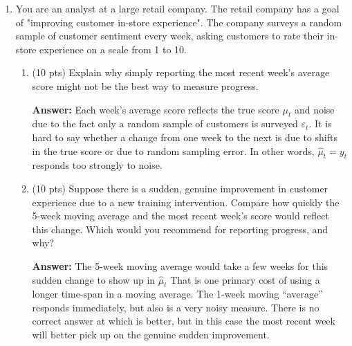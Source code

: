 \documentclass[12pt]{article}
\newcommand{\answer}[1]{{\color{blue_winged_teal}\textbf{Answer:} #1}}
\newcommand{\pts}[1]{{\color{zinc500}(#1 pts)}}
\begin{document}
\begin{enumerate}
\begin{enumerate}
    \answer{For every one additional worker a store has, the average daily revenue is expected to be \$2247 higher on average.}

    \item \pts{10} The company does not want to increase the number of staff if these results are not statistically significant.
    Perform and report a test of the null that $\beta_1 = 0$.
    The company is risk-adverse and want you to use a level of significance of $\alpha = 0.01$ (the z-score associated with this is $2.58$).

    \answer{
      The $t$-test associated with this is given by $\frac{2247 - 0}{980} = 2.29$. Since this is smaller than the critical value of $2.58$, we fail to reject the null at 1\% significance.
    }
  \end{enumerate}



  \newpage
  \item You are an analyst at a large retail company.
  The retail company has a goal of "improving customer in-store experience".
  The company surveys a random sample of customer sentiment every week, asking customers to rate their in-store experience on a scale from 1 to 10.

  \begin{enumerate}
    \item \pts{10} Explain why simply reporting the most recent week's average score might not be the best way to measure progress.

    \answer{
      Each week's average score reflects the true score $\mu_t$ and noise due to the fact only a random sample of customers is surveyed $\varepsilon_t$.
      It is hard to say whether a change from one week to the next is due to shifts in the true score or due to random sampling error.
      In other words, $\hat{\mu}_t = y_t$ responds too strongly to noise.
    }

    \item \pts{10} Suppose there is a sudden, genuine improvement in customer experience due to a new training intervention.
      Compare how quickly the 5-week moving average and the most recent week's score would reflect this change.
      Which would you recommend for reporting progress, and why?

    \answer{
      The 5-week moving average would take a few weeks for this sudden change to show up in $\hat{\mu}_t$
      That is one primary cost of using a longer time-span in a moving average.
      The 1-week moving ``average'' responds immediately, but also is a very noisy measure.
      There is no correct answer at which is better, but in this case the most recent week will better pick up on the genuine sudden improvement.
    }


\end{enumerate}
\end{enumerate}
\end{document}
